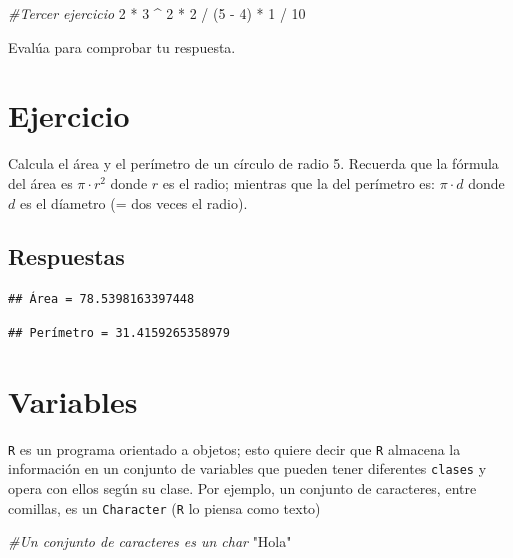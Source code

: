 \documentclass[]{tufte-book}
\newenvironment{Shaded}{}{}
\newcommand{\CommentTok}[1]{\textcolor[rgb]{0.38,0.63,0.69}{\textit{#1}}}
\newcommand{\DecValTok}[1]{\textcolor[rgb]{0.25,0.63,0.44}{#1}}
\newcommand{\NormalTok}[1]{#1}
\newcommand{\SpecialCharTok}[1]{\textcolor[rgb]{0.25,0.44,0.63}{#1}}
\newcommand{\StringTok}[1]{\textcolor[rgb]{0.25,0.44,0.63}{#1}}
\begin{document}
\begin{Shaded}
\begin{Highlighting}[]
\CommentTok{\#Tercer ejercicio }
\DecValTok{2} \SpecialCharTok{*} \DecValTok{3} \SpecialCharTok{\^{}} \DecValTok{2} \SpecialCharTok{*} \DecValTok{2} \SpecialCharTok{/}\NormalTok{ (}\DecValTok{5} \SpecialCharTok{{-}} \DecValTok{4}\NormalTok{) }\SpecialCharTok{*} \DecValTok{1} \SpecialCharTok{/} \DecValTok{10} 
\end{Highlighting}
\end{Shaded}

Evalúa para comprobar tu respuesta.

\hypertarget{ejercicio-1}{%
\section{Ejercicio}\label{ejercicio-1}}

Calcula el área y el perímetro de un círculo de radio 5. Recuerda que la
fórmula del área es \(\pi \cdot r^2\) donde \(r\) es el radio; mientras
que la del perímetro es: \(\pi \cdot d\) donde \(d\) es el díametro (=
dos veces el radio).

\hypertarget{respuestas}{%
\subsection{Respuestas}\label{respuestas}}

\begin{verbatim}
## Área = 78.5398163397448
\end{verbatim}

\begin{verbatim}
## Perímetro = 31.4159265358979
\end{verbatim}

\hypertarget{variables}{%
\section{Variables}\label{variables}}

\texttt{R} es un programa orientado a objetos; esto quiere decir que
\texttt{R} almacena la información en un conjunto de variables que
pueden tener diferentes \texttt{clases} y opera con ellos según su
clase. Por ejemplo, un conjunto de caracteres, entre comillas, es un
\texttt{Character} (\texttt{R} lo piensa como texto)

\begin{Shaded}
\begin{Highlighting}[]
\CommentTok{\#Un conjunto de caracteres es un char}
\StringTok{"Hola"}
\end{Highlighting}
\end{Shaded}
\end{document}
